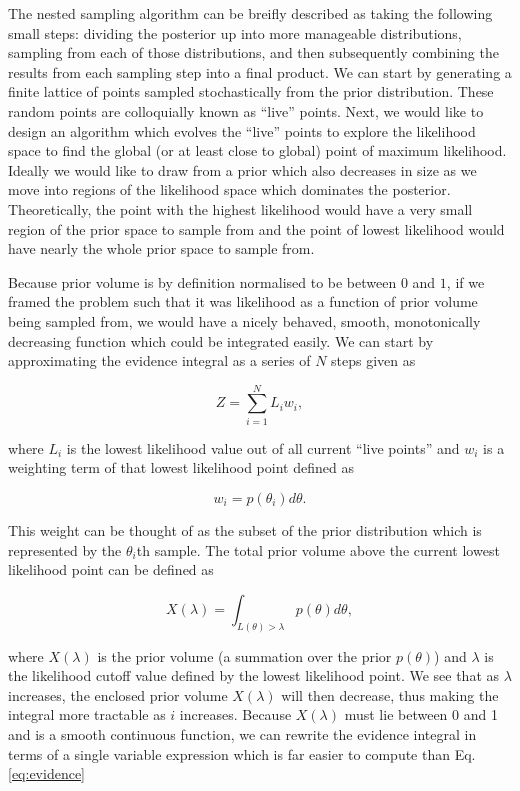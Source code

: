 The nested sampling algorithm can be breifly described as taking the following
small steps: dividing the posterior up into more manageable distributions, 
sampling from each of those distributions, and then subsequently combining the 
results from each sampling step into a final product. We can start by generating a finite lattice of points sampled stochastically from the prior distribution. These random points are colloquially known as ``live'' points. Next, we would like to design an algorithm which evolves the ``live'' points to explore the likelihood space to find the global (or at least close to global) point of maximum likelihood. Ideally we would like to draw from a prior which also decreases in size as we move into regions of the likelihood space which dominates the posterior. Theoretically, the point with the highest likelihood would have a very small region of the prior space to sample from and the point of lowest likelihood would have nearly the whole prior space to sample from.


%
%
Because prior volume is by definition normalised to be between $0$ and $1$,
if we framed the problem such that it was likelihood as a function of 
prior volume being sampled from, we would have a nicely behaved, 
smooth, monotonically decreasing function which could be integrated easily. 
We can start by approximating the evidence integral as a series of $N$ 
steps given as 

\begin{equation}
    Z = \sum_{i=1}^{N} L_i w_i,
\end{equation}

where $L_i$ is the lowest likelihood value out of all current ``live points''
and $w_i$ is a weighting term of that lowest likelihood point defined as 

\begin{equation}
    w_i = p(\theta_i) d\theta.
\end{equation}

This weight can be thought of as the subset of the prior distribution 
which is represented by the $\theta_i$th sample. The total prior volume 
above the current lowest likelihood point can be defined as

\begin{equation}
    X(\lambda) = \int_{L(\theta) > \lambda} p(\theta) d\theta,
\end{equation}

where $X(\lambda)$ is the prior volume (a summation over the prior $p(\theta)$) and $\lambda$ is the likelihood cutoff value defined by the lowest likelihood 
point. We see that as $\lambda$ increases, the enclosed prior volume
$X(\lambda)$ will then decrease, thus making the integral more tractable 
as $i$ increases. Because $X(\lambda)$ must lie between 0 and 1 and is a smooth continuous function, we can rewrite the evidence integral in terms of a single variable expression which is far easier to compute than Eq. \ref{eq:evidence}

